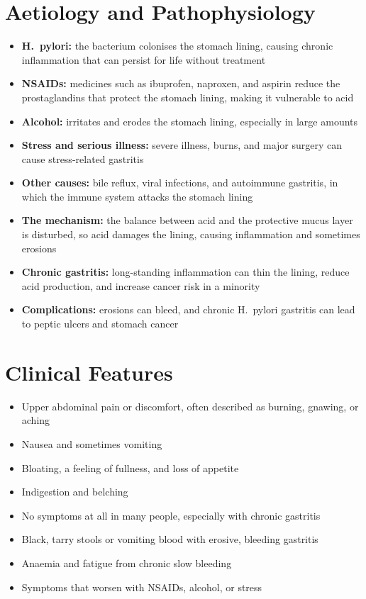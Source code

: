 \section*{Aetiology and Pathophysiology}
\begin{itemize}
    \item \textbf{H.\ pylori:} the bacterium colonises the stomach lining, causing chronic inflammation that can persist for life without treatment
    \item \textbf{NSAIDs:} medicines such as ibuprofen, naproxen, and aspirin reduce the prostaglandins that protect the stomach lining, making it vulnerable to acid
    \item \textbf{Alcohol:} irritates and erodes the stomach lining, especially in large amounts
    \item \textbf{Stress and serious illness:} severe illness, burns, and major surgery can cause stress-related gastritis
    \item \textbf{Other causes:} bile reflux, viral infections, and autoimmune gastritis, in which the immune system attacks the stomach lining
    \item \textbf{The mechanism:} the balance between acid and the protective mucus layer is disturbed, so acid damages the lining, causing inflammation and sometimes erosions
    \item \textbf{Chronic gastritis:} long-standing inflammation can thin the lining, reduce acid production, and increase cancer risk in a minority
    \item \textbf{Complications:} erosions can bleed, and chronic H.\ pylori gastritis can lead to peptic ulcers and stomach cancer
\end{itemize}

\section*{Clinical Features}
\begin{itemize}
    \item Upper abdominal pain or discomfort, often described as burning, gnawing, or aching
    \item Nausea and sometimes vomiting
    \item Bloating, a feeling of fullness, and loss of appetite
    \item Indigestion and belching
    \item No symptoms at all in many people, especially with chronic gastritis
    \item Black, tarry stools or vomiting blood with erosive, bleeding gastritis
    \item Anaemia and fatigue from chronic slow bleeding
    \item Symptoms that worsen with NSAIDs, alcohol, or stress
\end{itemize}

